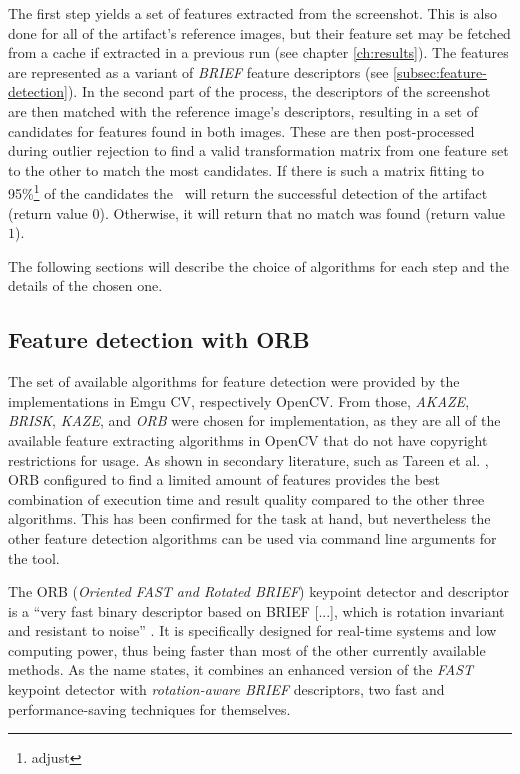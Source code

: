 The first step yields a set of features extracted from the screenshot. This is also done for all of the artifact's reference images, but their feature set may be fetched from a cache if extracted in a previous run (see chapter \ref{ch:results}). The features are represented as a variant of \emph{BRIEF} feature descriptors (see \ref{subsec:feature-detection}). In the second part of the process, the descriptors of the screenshot are then matched with the reference image's descriptors, resulting in a set of candidates for features found in both images. These are then post-processed during outlier rejection to find a valid transformation matrix from one feature set to the other to match the most candidates. If there is such a matrix fitting to 95\%\footnote{adjust} of the candidates the \vd~will return the successful detection of the artifact (return value $0$). Otherwise, it will return that no match was found (return value $1$).

The following sections will describe the choice of algorithms for each step and the details of the chosen one.

\subsection{Feature detection with ORB}\label{sec:tech-bg:subsec:feature-detection}

The set of available algorithms for feature detection were provided by the implementations in Emgu CV, respectively OpenCV. From those, \emph{AKAZE}, \emph{BRISK}, \emph{KAZE}, and \emph{ORB} were chosen for implementation, as they are all of the available feature extracting algorithms in OpenCV that do not have copyright restrictions for usage. As shown in secondary literature, such as Tareen et al. \cite{orb_comparison}, ORB configured to find a limited amount of features provides the best combination of execution time and result quality compared to the other three algorithms. This has been confirmed for the task at hand, but nevertheless the other feature detection algorithms can be used via command line arguments for the tool.

The ORB (\emph{Oriented FAST and Rotated BRIEF}) keypoint detector and descriptor is a ``very fast binary descriptor based on BRIEF [...], which is rotation invariant and resistant to noise'' \cite[p.~1]{orb}. It is specifically designed for real-time systems and low computing power, thus being faster than most of the other currently available methods. \cite{orb, orb_comparison} As the name states, it combines an enhanced version of the \emph{FAST}\cite{fast} keypoint detector with \emph{rotation-aware BRIEF}\cite{brief} descriptors, two fast and performance-saving techniques for themselves. \cite{orb, fast, brief}

